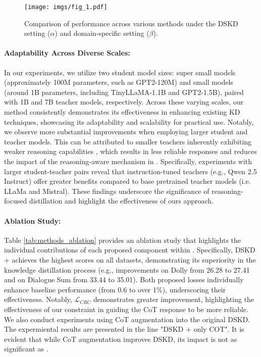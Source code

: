 \begin{figure}[t]
\centering
\begin{adjustbox}{width=0.48\textwidth}
\texttt{[image: imgs/fig\_1.pdf]}
\end{adjustbox}
\caption{Comparison of performance across various methods under the DSKD setting ($\alpha$) and domain-specific setting ($\beta$).}
\label{fig:scenario}
\end{figure}

\paragraph{Adaptability Across Diverse Scales:} In our experiments, we utilize two student model sizes: super small models (approximately 100M parameters, such as GPT2-120M) and small models (around 1B parameters, including TinyLLaMA-1.1B and GPT2-1.5B), paired with 1B and 7B teacher models, respectively. Across these varying scales, our method consistently demonstrates its effectiveness in enhancing existing KD techniques, showcasing its adaptability and scalability for practical use. Notably, we observe more substantial improvements when employing larger student and teacher models. This can be attributed to smaller teachers inherently exhibiting weaker reasoning capabilities \citep{shridhar2022distilling, bi-etal-2025-enhancing}, which results in less reliable responses and reduces the impact of the reasoning-aware mechanism in \method. Specifically, experiments with larger student-teacher pairs reveal that instruction-tuned teachers (e.g., Qwen 2.5 Instruct) offer greater benefits compared to base pretrained teacher models (i.e. LLaMa and Mistral). These findings underscore the significance of reasoning-focused distillation and highlight the effectiveness of ours approach.


\paragraph{Ablation Study:} Table \ref{tab:methods_ablation} provides an ablation study that highlights the individual contributions of each proposed component within \method.  Specifically, DSKD + \method achieves the highest scores on all datasets, demonstrating its superiority in the knowledge distillation process (e.g., improvements on Dolly from 26.28 to 27.41 and on Dialogue Sum from 33.44 to 35.01). Both proposed losses individually enhance baseline performance (from 0.6 to over 1\%), underscoring their effectiveness. Notably, $\mathcal{L}_{CRC}$ demonstrates greater improvement, highlighting the effectiveness of our constraint in guiding the CoT response to be more reliable. We also conduct experiments using CoT augmentation into the original DSKD. The expermiental results are presented in the line "DSKD + only COT".  It is evident that while CoT augmentation improves DSKD, its impact is not as significant as \method.

